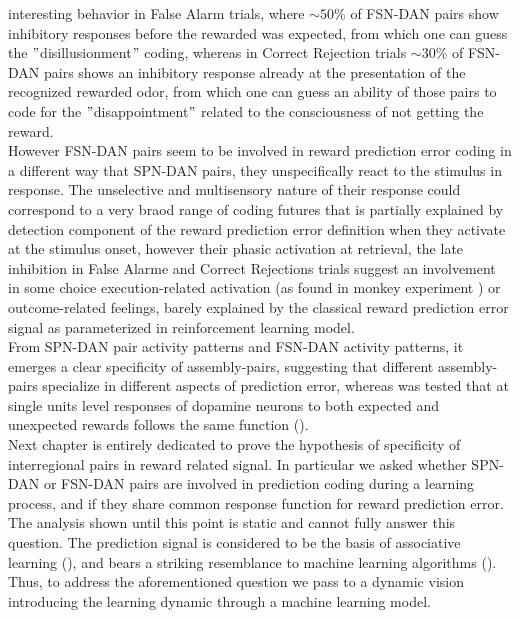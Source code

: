 interesting behavior in False Alarm trials, where $\sim 50\%$ of FSN-DAN pairs show inhibitory responses before the rewarded was expected, from which one can guess the $"$disillusionment$"$ coding, whereas in Correct Rejection trials $\sim 30\%$ of FSN-DAN pairs shows an inhibitory response already at the presentation of the recognized rewarded odor, from which one can guess an ability of those pairs to code for the $"$disappointment$"$ related to the consciousness of not getting the reward.\\However FSN-DAN pairs seem to be involved in reward prediction error coding in a different way that SPN-DAN pairs, they unspecifically react to the stimulus in response. The unselective and multisensory nature of their response could correspond to a very braod range of coding futures that is partially explained by detection component of the reward prediction error definition when they activate at the stimulus onset, however their phasic activation at retrieval, the late inhibition in False Alarme and Correct Rejections trials suggest an involvement in some choice execution-related activation (as found in monkey experiment \cite{Gage}) or outcome-related feelings, barely explained by the classical reward prediction error signal as parameterized in reinforcement learning model.\\From SPN-DAN pair activity patterns and FSN-DAN activity patterns, it emerges a clear specificity of assembly-pairs, suggesting that different assembly-pairs specialize in different aspects of prediction error, whereas was tested that at single units level responses of dopamine neurons to both expected and unexpected rewards follows the same function (\cite{UchidaDop}).\\Next chapter is entirely dedicated to prove the hypothesis of specificity of interregional pairs in reward related signal. In particular we asked whether SPN-DAN or FSN-DAN pairs are involved in prediction coding during a learning process, and if they share common response function for reward prediction error.\\The analysis shown until this point is static and cannot fully answer this question. The prediction signal is considered to be the basis of associative learning (\cite{RescorlaWagner}), and bears a striking resemblance to machine learning algorithms (\cite{SuttonBarto}). Thus, to address the aforementioned question we pass to a dynamic vision introducing the learning dynamic through a machine learning model.

